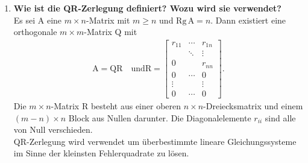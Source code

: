 \begin{enumerate}
		\item \textbf{Wie ist die QR-Zerlegung definiert? Wozu wird sie verwendet?} \\
			Es sei A eine \(m\times n\)-Matrix mit \(m\geq n\) und \(\text{Rg}\,\text{A} = n\). Dann existiert eine orthogonale \(m \times m\)-Matrix Q mit
			\begin{align*}
				\text{A}=\text{QR}\quad \text{und} \text{R}=\begin{bmatrix}
					r_{11} & \cdots & r_{1n} \\
					 & \ddots & \vdots \\
					 0 & & r_{nn} \\
					 0 & \cdots & 0 \\
					 \vdots & & \vdots \\
					 0 & \cdots & 0 
				\end{bmatrix}.
			\end{align*}
			Die \(m \times n\)-Matrix R besteht aus einer oberen \(n\times n\)-Dreiecksmatrix und einem \((m-n)\times n\) Block aus Nullen darunter. Die Diagonalelemente \(r_{ii}\) sind alle von Null verschieden. \\
			QR-Zerlegung wird verwendet um überbestimmte lineare Gleichungssysteme im Sinne der kleinsten Fehlerquadrate zu lösen.
		
	\end{enumerate}